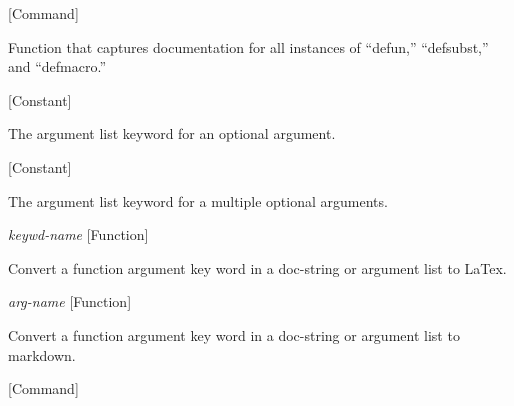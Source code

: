 \vspace{1em}
\noindent
{}
\usebox{\funcname}
 \hfill [Command]

\begin{doc-string}
Function that captures documentation for all instances of ``defun,'' ``defsubst,''
and ``defmacro.''
\end{doc-string}

\vspace{1em}
\noindent
{}
\usebox{\funcname}
 \hfill [Constant]

\begin{doc-string}
The argument list keyword for an optional argument.
\end{doc-string}

\vspace{1em}
\noindent
{}
\usebox{\funcname}
 \hfill [Constant]

\begin{doc-string}
The argument list keyword for a multiple optional arguments.
\end{doc-string}

\vspace{1em}
\noindent
{}
\usebox{\funcname}\emph{keywd-name}
 \hfill [Function]

\begin{doc-string}
Convert a function argument key word in a doc-string or argument list
to LaTex.
\end{doc-string}

\vspace{1em}
\noindent
{}
\usebox{\funcname}\emph{arg-name}
 \hfill [Function]

\begin{doc-string}
Convert a function argument key word in a doc-string or argument list
to markdown.
\end{doc-string}

\vspace{1em}
\noindent
{}
\usebox{\funcname}
 \hfill [Command]

